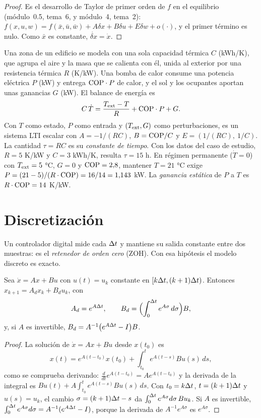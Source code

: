 \begin{proof}
Es el desarrollo de Taylor de primer orden de $f$ en el equilibrio (módulo~0.5, tema~6, y módulo~4, tema~2): $f(x,u,w)=f(\bar x,\bar u,\bar w)+A\delta x+B\delta u+E\delta w+o(\cdot)$, y el primer término es nulo. Como $\bar x$ es constante, $\dot{\delta x}=\dot x$.
\end{proof}

\begin{ejemplo}\label{ej:rc}
Una zona de un edificio se modela con una sola capacidad térmica $C$ (kWh/K), que agrupa el aire y la masa que se calienta con él, unida al exterior por una resistencia térmica $R$ (K/kW). Una bomba de calor consume una potencia eléctrica $P$ (kW) y entrega $\mathrm{COP}\cdot P$ de calor, y el sol y los ocupantes aportan unas ganancias $G$ (kW). El balance de energía es
\begin{equation}\label{eq:rc}
C\,\dot T=\frac{T_{\mathrm{ext}}-T}{R}+\mathrm{COP}\cdot P+G .
\end{equation}
Con $T$ como estado, $P$ como entrada y $(T_{\mathrm{ext}},G)$ como perturbaciones, es un sistema LTI escalar con $A=-1/(RC)$, $B=\mathrm{COP}/C$ y $E=(1/(RC),\ 1/C)$. La cantidad $\tau=RC$ es su \emph{constante de tiempo}. Con los datos del caso de estudio, $R=5$ K/kW y $C=3$ kWh/K, resulta $\tau=15$ h. En régimen permanente ($\dot T=0$) con $T_{\mathrm{ext}}=5$ °C, $G=0$ y $\mathrm{COP}=2{,}8$, mantener $T=21$ °C exige $P=(21-5)/(R\cdot\mathrm{COP})=16/14=1{,}143$ kW. La \emph{ganancia estática} de $P$ a $T$ es $R\cdot\mathrm{COP}=14$ K/kW.
\end{ejemplo}

\section{Discretización}

Un controlador digital mide cada $\Delta t$ y mantiene su salida constante entre dos muestras: es el \emph{retenedor de orden cero} (ZOH). Con esa hipótesis el modelo discreto es exacto.

\begin{proposicion}\label{prop:zoh}
Sea $\dot x=Ax+Bu$ con $u(t)=u_k$ constante en $[k\Delta t,(k+1)\Delta t)$. Entonces $x_{k+1}=A_dx_k+B_du_k$, con
\[
A_d=e^{A\Delta t},\qquad B_d=\Bigl(\int_0^{\Delta t}e^{A\sigma}\,d\sigma\Bigr)B,
\]
y, si $A$ es invertible, $B_d=A^{-1}\bigl(e^{A\Delta t}-I\bigr)B$.
\end{proposicion}

\begin{proof}
La solución de $\dot x=Ax+Bu$ desde $x(t_0)$ es
\[
x(t)=e^{A(t-t_0)}x(t_0)+\int_{t_0}^{t}e^{A(t-s)}Bu(s)\,ds,
\]
como se comprueba derivando: $\frac{d}{dt}e^{A(t-t_0)}=Ae^{A(t-t_0)}$ y la derivada de la integral es $Bu(t)+A\int_{t_0}^{t}e^{A(t-s)}Bu(s)\,ds$. Con $t_0=k\Delta t$, $t=(k+1)\Delta t$ y $u(s)=u_k$, el cambio $\sigma=(k+1)\Delta t-s$ da $\int_0^{\Delta t}e^{A\sigma}d\sigma\,Bu_k$. Si $A$ es invertible, $\int_0^{\Delta t}e^{A\sigma}d\sigma=A^{-1}(e^{A\Delta t}-I)$, porque la derivada de $A^{-1}e^{A\sigma}$ es $e^{A\sigma}$.
\end{proof}

